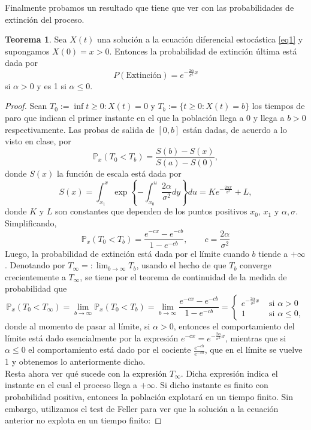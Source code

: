 \documentclass[letterpaper]{article}
\renewcommand{\to}{\rightarrow}
\renewcommand{\P}{\mathbb{P}}
\newcommand{\1}{\mathds{1}}
\theoremstyle{definition}
\theoremstyle{definition}
\newtheorem{teo}{Teorema}
\theoremstyle{definition}
\theoremstyle{definition}
\theoremstyle{definition}
\begin{document}
Finalmente probamos un resultado que tiene que ver con las probabilidades de extinción del proceso.
\begin{teo} 
 Sea $X(t)$ una solución a la ecuación diferencial estocástica \eqref{eq1} y supongamos $X(0)=x>0$. Entonces la probabilidad de 
 extinción última está dada por 
 \[
    P(\text{Extinción})=e^{-\frac{2\alpha}{\sigma^2}x}
\]
si $\alpha>0$ y es 1 si $\alpha\leq 0$. 
 \end{teo}
 \begin{proof} 
    Sean $T_0:=\inf{t\geq0 : X(t)=0}$ y $T_b:=\{t\geq0:X(t)=b\}$ los tiempos de paro que indican 
    el primer instante en el que la población llega a 0 y llega a $b>0$ respectivamente. Las probas de salida
    de $[0,b]$ están dadas, de acuerdo a lo visto en clase, por 
    \[
    \P_x\left(T_0<T_b\right)=\frac{S(b)-S(x)}{S(a)-S(0)},
    \]
    donde $S(x)$ la función de escala está dada por 
    \[
    S(x)=\int_{x_1}^{x}\exp \left\{-\int_{x_0}^{u}\frac{2\alpha}{\sigma^2}dy\right\}du=Ke^{-\frac{2\alpha x}{\sigma^2}}+L,
    \]
    donde $K$ y $L$ son constantes que dependen de los puntos positivos $x_0$, $x_1$ y $\alpha, \sigma$.
    Simplificando, 
    \[
        \P_x(T_0<T_b)=\frac{e^{-cx}-e^{-cb}}{1-e^{-cb}}, \qquad c=\frac{2\alpha}{\sigma^2}
    \]  
    Luego, la probabilidad de extinción está dada por el límite cuando $b$ tiende a $+\infty$. Denotando
    por $T_\infty=:\lim_{b\to\infty}T_b$, usando el hecho de que $T_b$ converge crecientemente a $T_\infty$, se 
    tiene por el teorema de continuidad de la medida de probabilidad que
    \[
        \P_x(T_0<T_\infty)=\lim_{b\to\infty} \P_x(T_0<T_b)=\lim_{b\to \infty}\frac{e^{-cx}-e^{-cb}}{1-e^{-cb}}=\begin{cases}
            e^{-\frac{2\alpha}{\sigma^2}x} & \text{ si } \alpha>0\\
            1 & \text{ si } \alpha\leq 0,
        \end{cases}
    \]
    donde al momento de pasar al límite, si $\alpha>0$, entonces el comportamiento del límite está dado esencialmente por 
    la expresión $e^{-cx}=e^{-\frac{2\alpha}{\sigma^2}x}$, mientras que si $\alpha\leq 0$ el comportamiento está dado 
    por el cociente $\frac{e^{-cb}}{e^{-cb}}$, que en el límite se vuelve 1 y obtenemos lo anteriormente dicho.\\

    Resta ahora ver qué sucede con la expresión $T_\infty$. Dicha expresión indica el instante en el cual el proceso llega a $+\infty$. 
    Si dicho instante es finito con probabilidad positiva, entonces la población explotará en un tiempo finito. Sin embargo, 
    utilizamos el test de Feller para ver que la solución a la ecuación anterior no explota en un tiempo finito:


\end{proof}
\end{document}
